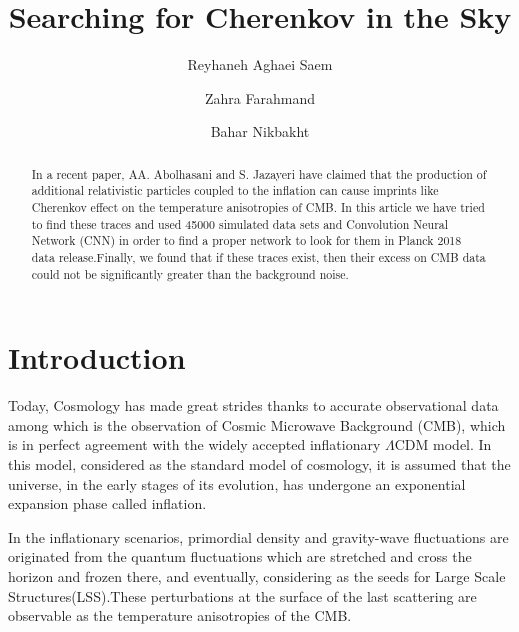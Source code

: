 \documentclass[10pt, english, pra,aps,twocolumn,floatfix,superscriptaddress]{revtex4-2}
\begin{document}
\title{Searching for Cherenkov in the Sky}
\author{Reyhaneh Aghaei Saem}
\author{Zahra Farahmand}
\author{Bahar Nikbakht}



\begin{abstract}
In a recent paper, AA. Abolhasani and S. Jazayeri have claimed that the production of additional relativistic particles coupled to the inflation can cause imprints like Cherenkov effect on the temperature anisotropies of CMB. In this article we have tried to find these traces and used 45000 simulated data sets and Convolution Neural Network (CNN) in order to find a proper network to look for them in Planck 2018 data release.Finally, we found that if these traces exist, then their excess on CMB data could not be significantly greater than the background noise.
\end{abstract}

\maketitle
    
\section{Introduction}
Today, Cosmology has made great strides thanks to accurate observational data among which is the observation of Cosmic Microwave Background (CMB), which is in perfect agreement with the widely accepted inflationary $\Lambda$CDM model\cite{2018planck}. In this model, considered as the standard model of cosmology, it is assumed that the universe, in the early stages of its evolution, has undergone an exponential expansion phase called inflation\cite{guth,Starobinsky:1980te,Linde:1981mu}.

In the inflationary scenarios, primordial density and gravity-wave fluctuations are originated from the quantum fluctuations which are stretched and cross the horizon and frozen there, and eventually, considering as the seeds for Large Scale Structures(LSS)\cite{Bartolo_2004}.These perturbations at the surface of the last scattering are observable as the temperature anisotropies of the CMB.
\end{document}
